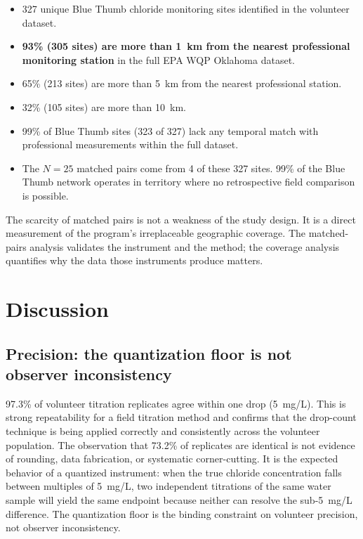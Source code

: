 \documentclass[lineno]{wlpeerj}
\begin{document}
\begin{itemize}
  \item 327 unique Blue Thumb chloride monitoring sites identified in the volunteer dataset.
  \item \textbf{93\% (305 sites) are more than 1~km from the nearest professional monitoring station} in the full EPA WQP Oklahoma dataset.
  \item 65\% (213 sites) are more than 5~km from the nearest professional station.
  \item 32\% (105 sites) are more than 10~km.
  \item 99\% of Blue Thumb sites (323 of 327) lack any temporal match with professional measurements within the full dataset.
  \item The $N=25$ matched pairs come from 4 of these 327 sites. 99\% of the Blue Thumb network operates in territory where no retrospective field comparison is possible.
\end{itemize}

The scarcity of matched pairs is not a weakness of the study design. It is a direct measurement of the program's irreplaceable geographic coverage. The matched-pairs analysis validates the instrument and the method; the coverage analysis quantifies why the data those instruments produce matters.

\section{Discussion}

\subsection{Precision: the quantization floor is not observer inconsistency}

97.3\% of volunteer titration replicates agree within one drop (5~mg/L). This is strong repeatability for a field titration method and confirms that the drop-count technique is being applied correctly and consistently across the volunteer population. The observation that 73.2\% of replicates are identical is not evidence of rounding, data fabrication, or systematic corner-cutting. It is the expected behavior of a quantized instrument: when the true chloride concentration falls between multiples of 5~mg/L, two independent titrations of the same water sample will yield the same endpoint because neither can resolve the sub-5~mg/L difference. The quantization floor is the binding constraint on volunteer precision, not observer inconsistency.
\end{document}
